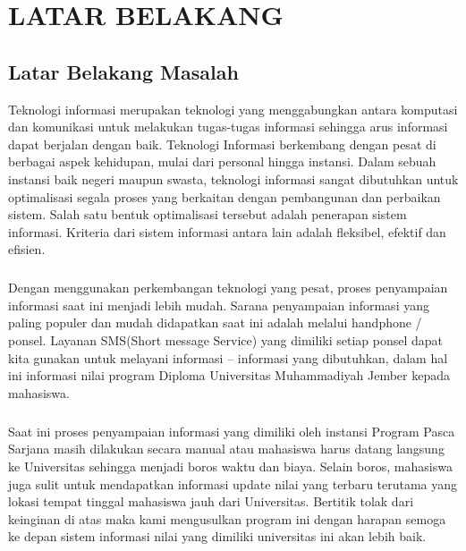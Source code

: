\documentclass{jtetiproposalskripsi}
\begin{document}
\tableofcontents
{}
\clearpage{}\setcounter{page}{1}

\chapter{LATAR BELAKANG}

\section{Latar Belakang Masalah}
Teknologi informasi merupakan teknologi yang menggabungkan antara komputasi dan komunikasi untuk melakukan tugas-tugas informasi sehingga arus informasi dapat berjalan dengan baik. Teknologi Informasi berkembang dengan pesat di berbagai aspek kehidupan, mulai dari personal hingga instansi. Dalam sebuah instansi baik negeri maupun swasta, teknologi informasi sangat dibutuhkan untuk optimalisasi segala proses yang berkaitan dengan pembangunan dan perbaikan sistem. Salah satu bentuk optimalisasi tersebut adalah penerapan sistem informasi. Kriteria dari sistem informasi antara lain adalah fleksibel, efektif dan efisien. 
\paragraph{}
Dengan menggunakan perkembangan teknologi yang pesat, proses penyampaian informasi saat ini menjadi lebih mudah. Sarana penyampaian informasi yang paling populer dan mudah didapatkan saat ini adalah melalui handphone / ponsel. Layanan SMS(Short message Service) yang dimiliki setiap ponsel dapat kita gunakan untuk melayani informasi – informasi yang dibutuhkan, dalam hal ini informasi nilai program Diploma Universitas Muhammadiyah Jember kepada mahasiswa. 
\paragraph{}
Saat ini proses penyampaian informasi yang dimiliki oleh instansi Program Pasca Sarjana masih dilakukan secara manual atau mahasiswa harus datang langsung ke Universitas sehingga menjadi boros waktu dan biaya. Selain boros, mahasiswa juga sulit untuk mendapatkan informasi update nilai yang terbaru terutama yang lokasi tempat tinggal mahasiswa jauh dari Universitas. Bertitik tolak dari keinginan di atas maka kami mengusulkan program ini dengan harapan semoga ke depan sistem informasi nilai yang dimiliki universitas ini akan lebih baik.
\end{document}
